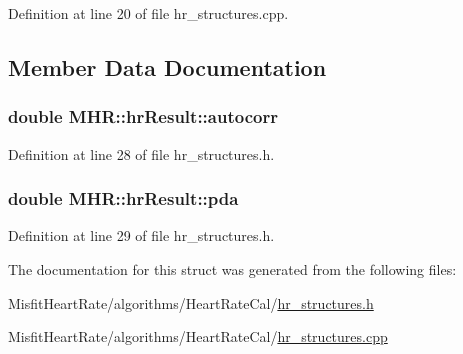Definition at line 20 of file hr\+\_\+structures.\+cpp.



\subsection{Member Data Documentation}
\hypertarget{struct_m_h_r_1_1hr_result_a369652948d5ff326dc1a822cbc0cc082}{
\subsubsection[{autocorr}]{\setlength{\rightskip}{0pt plus 5cm}double M\+H\+R\+::hr\+Result\+::autocorr}}\label{struct_m_h_r_1_1hr_result_a369652948d5ff326dc1a822cbc0cc082}


Definition at line 28 of file hr\+\_\+structures.\+h.

\hypertarget{struct_m_h_r_1_1hr_result_a7b5e354201327bd08c0ebded5c48367d}{
\subsubsection[{pda}]{\setlength{\rightskip}{0pt plus 5cm}double M\+H\+R\+::hr\+Result\+::pda}}\label{struct_m_h_r_1_1hr_result_a7b5e354201327bd08c0ebded5c48367d}


Definition at line 29 of file hr\+\_\+structures.\+h.



The documentation for this struct was generated from the following files\+:\begin{DoxyCompactItemize}
\item 
Misfit\+Heart\+Rate/algorithms/\+Heart\+Rate\+Cal/\hyperlink{hr__structures_8h}{hr\+\_\+structures.\+h}\item 
Misfit\+Heart\+Rate/algorithms/\+Heart\+Rate\+Cal/\hyperlink{hr__structures_8cpp}{hr\+\_\+structures.\+cpp}\end{DoxyCompactItemize}
